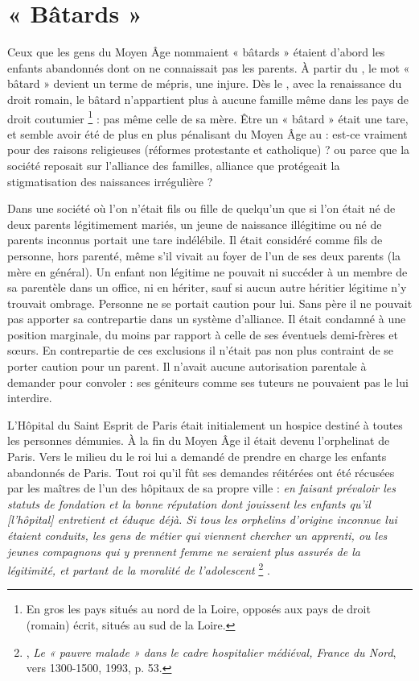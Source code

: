\section{« Bâtards »}

 Ceux que les gens du Moyen Âge nommaient « bâtards » étaient d'abord les enfants abandonnés dont on ne connaissait pas les parents. À partir du , le mot « bâtard » devient un terme de mépris, une injure. Dès le , avec la renaissance du droit romain, le bâtard n'appartient plus à aucune famille même dans les pays de droit coutumier%
\footnote{En gros les pays situés au nord de la Loire, opposés aux pays de droit (romain) écrit, situés au sud de la Loire.} 
: pas même celle de sa mère. Être un « bâtard » était une tare, et semble avoir été de plus en plus pénalisant du Moyen Âge au  : est-ce vraiment pour des raisons religieuses (réformes protestante et catholique) ? ou parce que la société reposait sur l'alliance des familles, alliance que protégeait la stigmatisation des naissances irrégulière ?

 Dans une société où l'on n'était fils ou fille de quelqu'un que si l'on était né de deux parents légitimement mariés, un jeune de naissance illégitime ou né de parents inconnus portait une tare indélébile. Il était considéré comme fils de personne, hors parenté, même s'il vivait au foyer de l'un de ses deux parents (la mère en général). Un enfant non légitime ne pouvait ni succéder à un membre de sa parentèle dans un office, ni en hériter, sauf si aucun autre héritier légitime n'y trouvait ombrage. Personne ne se portait caution pour lui. Sans père il ne pouvait pas apporter sa contrepartie dans un système d'alliance. Il était condamné à une position marginale, du moins par rapport à celle de ses éventuels demi-frères et sœurs. En contrepartie de ces exclusions il n'était pas non plus contraint de se porter caution pour un parent. Il n'avait aucune autorisation parentale à demander pour convoler : ses géniteurs comme ses tuteurs ne pouvaient pas le lui interdire.

 L'Hôpital du Saint Esprit de Paris était initialement un hospice destiné à toutes les personnes démunies. À la fin du Moyen Âge il était devenu l'orphelinat de Paris. Vers le milieu du  le roi lui a demandé de prendre en charge les enfants abandonnés de Paris. Tout roi qu'il fût ses demandes réitérées ont été récusées par les maîtres de l'un des hôpitaux de sa propre ville : \emph{en faisant prévaloir les statuts de fondation et la bonne réputation dont jouissent les enfants qu'il \emph{[l'hôpital]} entretient et éduque déjà. Si tous les orphelins d'origine inconnue lui étaient conduits, les gens de métier qui viennent chercher un apprenti, ou les jeunes compagnons qui y prennent femme ne seraient plus assurés de la légitimité, et partant de la moralité de l'adolescent}%
\footnote{, \emph{Le « pauvre malade » dans le cadre hospitalier médiéval, France du Nord}, vers 1300-1500, 1993, p. 53.}%
.

